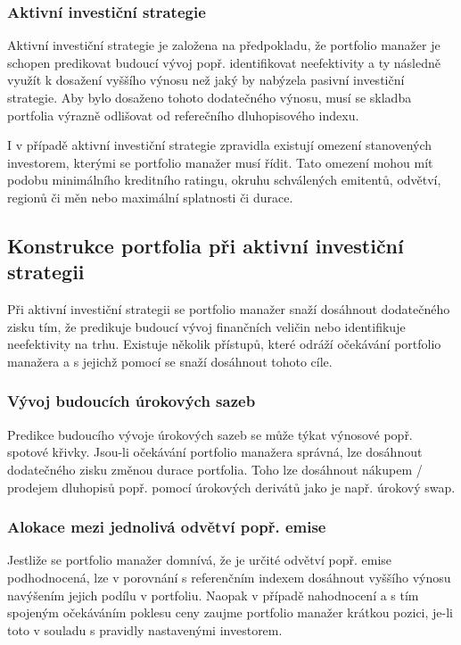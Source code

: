 \documentclass[a4paper]{book}
\begin{document}
\subsubsection{Aktivní investiční strategie}

Aktivní investiční strategie je založena na předpokladu, že portfolio manažer je schopen predikovat budoucí vývoj popř. identifikovat neefektivity a ty následně využít k dosažení vyššího výnosu než jaký by nabýzela pasivní investiční strategie. Aby bylo dosaženo tohoto dodatečného výnosu, musí se skladba portfolia výrazně odlišovat od referečního dluhopisového indexu.

I v případě aktivní investiční strategie zpravidla existují omezení stanovených investorem, kterými se portfolio manažer musí řídit. Tato omezení mohou mít podobu minimálního kreditního ratingu, okruhu schválených emitentů, odvětví, regionů či měn nebo maximální splatnosti či durace.

\subsection{Konstrukce portfolia při aktivní investiční strategii}

Při aktivní investiční strategii se portfolio manažer snaží dosáhnout dodatečného zisku tím, že predikuje budoucí vývoj finančních veličin nebo identifikuje neefektivity na trhu. Existuje několik přístupů, které odráží očekávání portfolio manažera a s jejichž pomocí se snaží dosáhnout tohoto cíle.

\subsubsection{Vývoj budoucích úrokových sazeb}

Predikce budoucího vývoje úrokových sazeb se může týkat výnosové popř. spotové křivky. Jsou-li očekávání portfolio manažera správná, lze dosáhnout dodatečného zisku změnou durace portfolia. Toho lze dosáhnout nákupem / prodejem dluhopisů popř. pomocí úrokových derivátů jako je např. úrokový swap.

\subsubsection{Alokace mezi jednolivá odvětví popř. emise}

Jestliže se portfolio manažer domnívá, že je určité odvětví popř. emise podhodnocená, lze v porovnání s referenčním indexem dosáhnout vyššího výnosu navýšením jejich podílu v portfoliu. Naopak v případě nahodnocení a s tím spojeným očekáváním poklesu ceny zaujme portfolio manažer krátkou pozici, je-li toto v souladu s pravidly nastavenými investorem.
\end{document}
